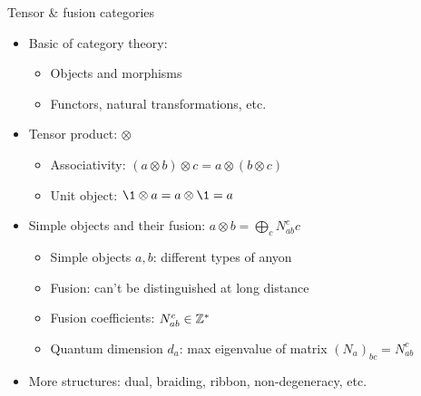 \documentclass{fdubeamer}
\begin{document}
\begin{frame}{Tensor \& fusion categories}

\begin{itemize}
  \item Basic of category theory:

    \begin{itemize}
      \item Objects and morphisms
      \item Functors, natural transformations, etc.
    \end{itemize}

  \item Tensor product: $\otimes$

    \begin{itemize}
      \item Associativity: $(a\otimes b)\otimes c=a\otimes(b\otimes c)$
      \item Unit object: $\1\otimes a=a\otimes\1=a$
    \end{itemize}

  \item Simple objects and their fusion: $a\otimes b=\bigoplus_c N_{ab}^c c$

    \begin{itemize}
      \item Simple objects $a,b$: different types of anyon
      \item Fusion: can't be distinguished at long distance
      \item Fusion coefficients: $N_{ab}^c\in\mathbb{Z}^*$
      \item Quantum dimension $d_a$: max eigenvalue of matrix $(N_a)_{bc}=N_{ab}^c$
    \end{itemize}

  \item More structures: dual, braiding, ribbon, non-degeneracy, etc.
\end{itemize}

\end{frame}
\end{document}
